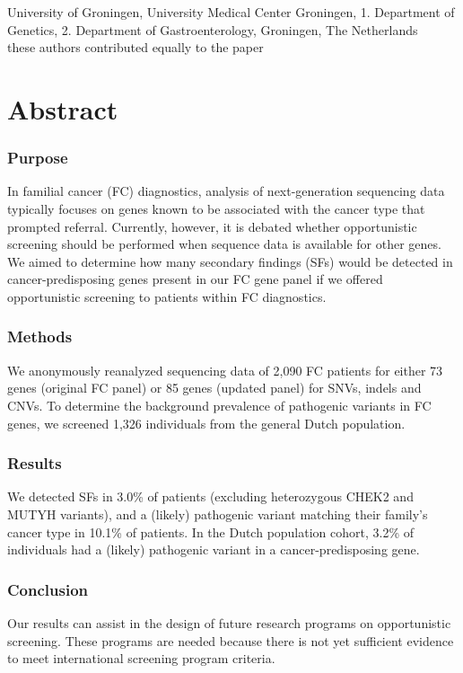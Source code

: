 \noindent
University of Groningen, University Medical Center Groningen, 1. Department of Genetics, 2. Department of Gastroenterology, Groningen, The Netherlands\\

\noindent* these authors contributed equally to the paper


\section*{Abstract}\label{abstract}
\subsubsection{Purpose}
In familial cancer (FC) diagnostics, analysis of next-generation sequencing data typically focuses on genes known to be associated with the cancer type that prompted referral. Currently, however, it is debated whether opportunistic screening should be performed when sequence data is available for other genes. We aimed to determine how many secondary findings (SFs) would be detected in cancer-predisposing genes present in our FC gene panel if we offered opportunistic screening to patients within FC diagnostics.
\subsubsection{Methods}
We anonymously reanalyzed sequencing data of 2,090 FC patients for either 73 genes (original FC panel) or 85 genes (updated panel) for SNVs, indels and CNVs. To determine the background prevalence of pathogenic variants in FC genes, we screened 1,326 individuals from the general Dutch population.
\subsubsection{Results}
We detected SFs in 3.0\% of patients (excluding heterozygous CHEK2 and MUTYH variants), and a (likely) pathogenic variant matching their family’s cancer type in 10.1\% of patients. In the Dutch population cohort, 3.2\% of individuals had a (likely) pathogenic variant in a cancer-predisposing gene. 
\subsubsection{Conclusion}
Our results can assist in the design of future research programs on opportunistic screening. These programs are needed because there is not yet sufficient evidence to meet international screening program criteria. 

